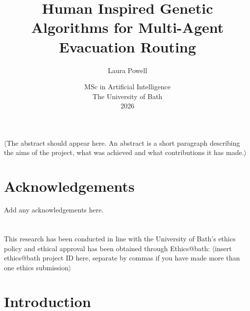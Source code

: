 \documentclass[12pt,a4paper]{report}
\title{\bf Human Inspired Genetic Algorithms for Multi-Agent Evacuation Routing}
\author{Laura Powell}
\date{MSc in Artificial Intelligence\\ 
      The University of Bath\\
      2026}
\begin{document}
\hypersetup{pageanchor=false}

\lstset{language=Java,breaklines,breakatwhitespace,basicstyle=\small}

\setcounter{page}{0}

\maketitle
\newpage
%

\newpage

\hypersetup{pageanchor=true}

\abstract
$\langle$The abstract should appear here. An abstract is a short paragraph describing the aims of the project, what was achieved and what contributions it has made.$\rangle$
\newpage

\tableofcontents
\newpage

\listoffigures
\newpage

\listoftables
\newpage

\chapter*{Acknowledgements}

Add any acknowledgements here.

\newpage

\chapter*{}
This research has been conducted in line with the University of Bath’s ethics policy and ethical approval has been obtained through Ethics@bath: $\langle$insert ethics@bath project ID here, separate by commas if you have made more than one ethics submission$\rangle$

\newpage
\setcounter{page}{1}

\chapter{Introduction}
\end{document}
